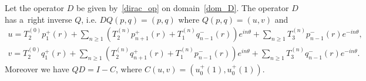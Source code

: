 \begin{prop}
\label{cont_para}
Let the operator $D$ be given by~\eqref{dirac_op} on domain~\eqref{dom_D}.
The operator $D$ has a~right inverse $Q$, i.e.
$DQ(p,q)=(p,q)$ where $Q(p,q)=({u},{v})$ and
\begin{gather*}
{u} = T_2^{(0)}p_1^+(r) + \sum\limits_{n\ge 1}\left(T_2^{(n)}p_{n+1}^+(r) + T_1^{(n)}q_{n-1}^-(r)\right)e^{in\theta} +
\sum\limits_{n\ge1} T_3^{(n)}p_{n-1}^-(r)e^{-in\theta},
\\
{v} = T_2^{(0)}q_1^+(r) + \sum\limits_{n\ge 1}\left(T_2^{(n)}q_{n+1}^+(r) + T_1^{(n)}p_{n-1}^-(r)\right)e^{in\theta} +
\sum\limits_{n\ge1} T_3^{(n)}q_{n-1}^-(r)e^{-in\theta}.
\end{gather*}
Moreover we have $QD= I - C$, where $C(u,v) = \left(u_0^+(1), u_0^+(1)\right)$.
\end{prop}

